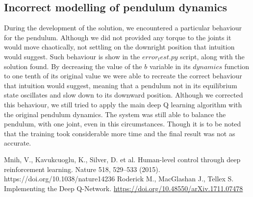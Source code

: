 \documentclass[twocolumn, a4paper]{article}
\begin{document}
\subsection{Incorrect modelling of pendulum dynamics}
During the development of the solution, we encountered a particular behaviour
for the pendulum. Although we did not provided any torque to the joints it would
move chaotically, not settling on the downright position that intuition would
suggest. Such behaviour is show in the $error_test.py$ script, along with the
solution found. By decreasing the value of the $b$ variable in its $dynamics$
function to one tenth of its original value we were able to recreate the correct
behaviour that intuition would suggest, meaning that a pendulum not in its
equilibrium state oscillates and slow down to its downward position. Although
we corrected this behaviour, we still tried to apply the main deep Q learning
algorithm with the original pendulum dynamics. The system was still able to
balance the pendulum, with one joint, even in this circumstances. Though it is
to be noted that the training took considerable more time and the final
result was not as accurate.

\vfill

\begin{thebibliography}{9}
	Mnih, V., Kavukcuoglu, K., Silver, D. et al. Human-level control through
	deep reinforcement learning. Nature 518, 529–533 (2015).
	https://doi.org/10.1038/nature14236
	Roderick M., MacGlashan J., Tellex S. Implementing the Deep Q-Network.
	\href{https://doi.org/10.48550/arXiv.1711.07478}
		 {https://doi.org/10.48550/arXiv.1711.07478}
\end{thebibliography}
\end{document}
